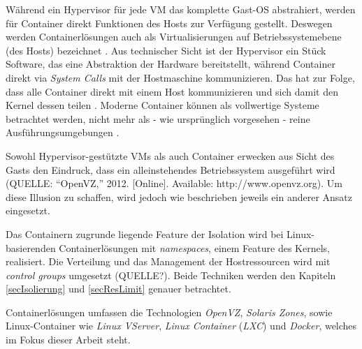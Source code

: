 \documentclass[../main.tex]{subfiles}
\begin{document}
      Während ein Hypervisor für jede VM das komplette Gast-OS abstrahiert, werden für Container direkt Funktionen des Hosts zur Verfügung gestellt. Deswegen werden Containerlösungen auch als Virtualisierungen auf Betriebssystemebene (des Hosts) bezeichnet \cite[S.6]{dockerBook}\cite[S.2]{containerVirtPerformance}. Aus technischer Sicht ist der Hypervisor ein Stück Software, das eine Abstraktion der Hardware bereitstellt, während Container direkt via \emph{System Calls} mit der Hostmaschine kommunizieren. Das hat zur Folge, dass alle Container direkt mit einem Host kommunizieren und sich damit den Kernel dessen teilen \cite[S.2]{containerVirtPerformance}\cite[S.3]{dockerLXCKub}. Moderne Container können als vollwertige Systeme betrachtet werden, nicht mehr als - wie ursprünglich vorgesehen - reine Ausführungsumgebungen \cite[S.7]{dockerBook}.

      Sowohl Hypervisor-gestützte VMs als auch Container erwecken aus Sicht des Gasts den Eindruck, dass ein alleinstehendes Betriebssystem ausgeführt wird (QUELLE: “OpenVZ,” 2012. [Online]. Available: http://www.openvz.org). Um diese Illusion zu schaffen, wird jedoch wie beschrieben jeweils ein anderer Ansatz eingesetzt.

      Das Containern zugrunde liegende Feature der Isolation wird bei Linux-basierenden Containerlösungen mit \emph{namespaces}, einem Feature des Kernels, realisiert. Die Verteilung und das Management der Hostressourcen wird mit \emph{control groups} umgesetzt (QUELLE?). Beide Techniken werden den Kapiteln \ref{secIsolierung} und \ref{secResLimit} genauer betrachtet.


      Containerlösungen umfassen die Technologien \emph{OpenVZ}, \emph{Solaris Zones}, sowie Linux-Container wie \emph{Linux VServer}, \emph{Linux Container} (\emph{LXC}) \cite[S.7]{dockerBook}\cite[S.1]{containerVirtPerformance} und \emph{Docker}, welches im Fokus dieser Arbeit steht.
\end{document}
